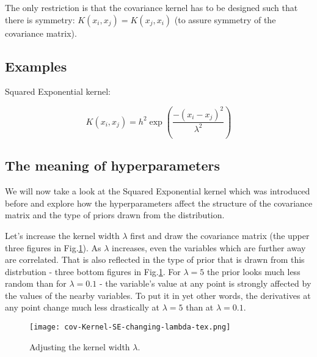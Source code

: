 \documentclass[10pt,twocolumn]{article}
\newcommand\pythonstyle{\lstset{
language=Python,
basicstyle=\ttm,
otherkeywords={self},             %
keywordstyle=\ttb\color{deepblue},
emph={MyClass,__init__},          %
emphstyle=\ttb\color{deepred},    %
stringstyle=\color{deepgreen},
frame=tb,                         %
showstringspaces=false            %
}}
\newcommand\pythoninline[1]{{\pythonstyle\lstinline!#1!}}
\begin{document}
The only restriction is that the covariance kernel has to be designed such that there is symmetry: $K(x_i, x_j) = K(x_j, x_i)$ (to assure symmetry of the covariance matrix).


\subsection{Examples}

Squared Exponential kernel:

\begin{equation}
K(x_i, x_j) = h^2 \exp(\frac{- (x_i - x_j)^2}{\lambda^2})
\end{equation}


\subsection{The meaning of hyperparameters} \label{sec:meaning-of-hyp}

We will now take a look at the Squared Exponential kernel which was introduced before and explore how the hyperparameters affect the structure of the covariance matrix and the type of priors drawn from the distribution.


Let's increase the kernel width $\lambda$ first and draw the covariance matrix (the upper three figures in Fig.\ref{fig:SE-kernel-width}). As $\lambda$ increases, even the variables which are further away are correlated. That is also reflected in the type of prior that is drawn from this distrbution - three bottom figures in Fig.\ref{fig:SE-kernel-width}. For $\lambda = 5$ the prior looks much less random than for $\lambda = 0.1$ - the variable's value at any point is strongly affected by the values of the nearby variables. To put it in yet other words, the derivatives at any point change much less drastically at $\lambda = 5$ than at $\lambda = 0.1$.

\begin{figure}[H]
\centering\texttt{[image: cov-Kernel-SE-changing-lambda-tex.png]}
\caption{Adjusting the kernel width $\lambda$.}
\label{fig:SE-kernel-width}
\end{figure}
\end{document}
